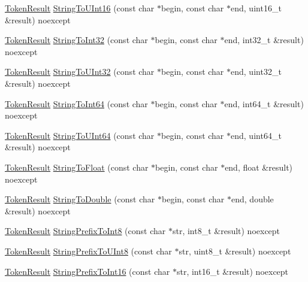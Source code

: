 \begin{DoxyCompactItemize}
\hyperlink{namespacemage_a2178ba2411db5912f41b2e7698c2037d}{Token\+Result} \hyperlink{namespacemage_ae222987eda35d97246335ef5444d49f6}{String\+To\+U\+Int16} (const char $\ast$begin, const char $\ast$end, uint16\+\_\+t \&result) noexcept
\item 
\hyperlink{namespacemage_a2178ba2411db5912f41b2e7698c2037d}{Token\+Result} \hyperlink{namespacemage_a33dacf308f60d63900ba66f2c4930460}{String\+To\+Int32} (const char $\ast$begin, const char $\ast$end, int32\+\_\+t \&result) noexcept
\item 
\hyperlink{namespacemage_a2178ba2411db5912f41b2e7698c2037d}{Token\+Result} \hyperlink{namespacemage_af9328ed978624abf0f07170676c02197}{String\+To\+U\+Int32} (const char $\ast$begin, const char $\ast$end, uint32\+\_\+t \&result) noexcept
\item 
\hyperlink{namespacemage_a2178ba2411db5912f41b2e7698c2037d}{Token\+Result} \hyperlink{namespacemage_a12c5810917a3765941a9985d1d6f88f4}{String\+To\+Int64} (const char $\ast$begin, const char $\ast$end, int64\+\_\+t \&result) noexcept
\item 
\hyperlink{namespacemage_a2178ba2411db5912f41b2e7698c2037d}{Token\+Result} \hyperlink{namespacemage_aa52c33c74b1b249f81e4a0a93c289ac9}{String\+To\+U\+Int64} (const char $\ast$begin, const char $\ast$end, uint64\+\_\+t \&result) noexcept
\item 
\hyperlink{namespacemage_a2178ba2411db5912f41b2e7698c2037d}{Token\+Result} \hyperlink{namespacemage_a07f25308f08c6ce105267f1dba8c301c}{String\+To\+Float} (const char $\ast$begin, const char $\ast$end, float \&result) noexcept
\item 
\hyperlink{namespacemage_a2178ba2411db5912f41b2e7698c2037d}{Token\+Result} \hyperlink{namespacemage_ad96af9db0cdf8ad8b9bd9849e70f4683}{String\+To\+Double} (const char $\ast$begin, const char $\ast$end, double \&result) noexcept
\item 
\hyperlink{namespacemage_a2178ba2411db5912f41b2e7698c2037d}{Token\+Result} \hyperlink{namespacemage_ac6b23bd334cbd5fad3e492f3298eab85}{String\+Prefix\+To\+Int8} (const char $\ast$str, int8\+\_\+t \&result) noexcept
\item 
\hyperlink{namespacemage_a2178ba2411db5912f41b2e7698c2037d}{Token\+Result} \hyperlink{namespacemage_af222f8684678db2d5246eb8e31a2b832}{String\+Prefix\+To\+U\+Int8} (const char $\ast$str, uint8\+\_\+t \&result) noexcept
\item 
\hyperlink{namespacemage_a2178ba2411db5912f41b2e7698c2037d}{Token\+Result} \hyperlink{namespacemage_a0492b9216a663ea5ed6ad1deac9e38f8}{String\+Prefix\+To\+Int16} (const char $\ast$str, int16\+\_\+t \&result) noexcept

\end{DoxyCompactItemize}
